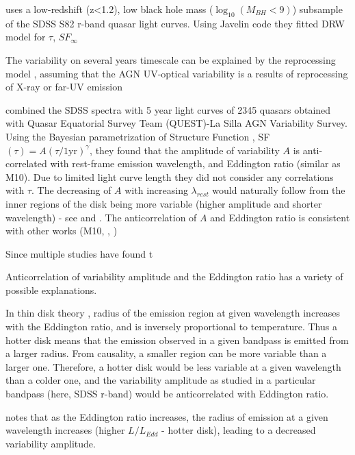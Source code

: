 \documentclass[twocolumn]{aastex62}
\begin{document}
\citep{guo2017} uses a low-redshift (z<1.2), low black hole mass ($\log_{10}{(M_{BH}<9)}$)  subsample of the SDSS S82 r-band quasar light curves. Using Javelin \cite{zu2011} code they fitted DRW model for $\tau$, $SF_{\infty}$ 


The variability on several years timescale can be explained by the reprocessing model \cite{kokubo2015}, assuming that the AGN UV-optical variability is a results of reprocessing of X-ray or far-UV emission \citep{krolik1991}

\citep{sanchez2018} combined the SDSS spectra with 5 year light curves of 2345 quasars obtained with Quasar Equatorial Survey Team (QUEST)-La Silla AGN Variability Survey. Using the Bayesian parametrization of Structure Function \citep{schmidt2010},  SF$(\tau) = A(\tau/1 \mathrm{yr})^{\gamma} $, they found that the amplitude of variability $A$ is anti-correlated with rest-frame emission wavelength,  and Eddington ratio (similar as M10).  Due to limited light curve length they did not consider any correlations with $\tau$. The decreasing of  $A$ with increasing  $\lambda_{rest}$ would naturally follow from the inner regions of the disk being more variable (higher amplitude and  shorter wavelength) - see \citep{fausnaugh2016} and \citep{edelson2015}. The anticorrelation of $A$ and Eddington ratio is consistent with other works (M10, \citealt{simm2016}, \citealt{rakshit2017})


Since multiple studies have found t






Anticorrelation of  variability amplitude and the Eddington ratio  has a variety of possible explanations. 

In thin disk theory \cite{shakura1973, frank2002, netzer2013}, radius of the emission region at given wavelength increases with the Eddington ratio, and is inversely proportional to temperature\cite{rakshit2017}. Thus a hotter disk means that the emission observed in a given bandpass is emitted from a larger radius. From causality, a smaller region can be more variable than a larger one. Therefore, a  hotter disk would be less variable at a given wavelength than a colder one, and  the variability amplitude as studied in a particular bandpass (here, SDSS r-band) would be anticorrelated with Eddington ratio. 




\cite{rakshit2017}  notes that as the Eddington ratio increases,  the radius of emission at a given wavelength increases (higher $L/L_{Edd}$ - hotter disk), leading to a decreased variability amplitude. 
\end{document}
